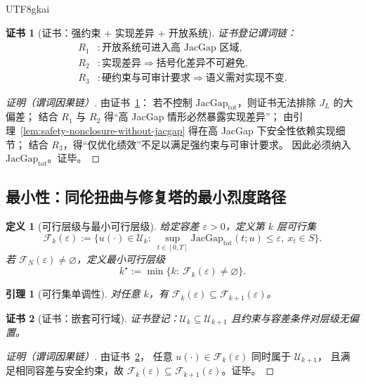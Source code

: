 \documentclass[12pt]{article}
\newtheorem{definition}{定义}[section]
\newtheorem{lemma}{引理}[section]
\newtheorem{Certificate}{证书}[section]
\newcommand{\JacGap}{\ensuremath{\mathrm{JacGap}}} %
\begin{document}
\begin{CJK*}{UTF8}{gkai}
\begin{Certificate}[证书：强约束 + 实现差异 + 开放系统]
\label{cert:necessity-jacgap}
证书登记谓词链：
\[
\begin{aligned}
  R_1 &: \text{开放系统可进入高 JacGap 区域},\\
  R_2 &: \text{实现差异}\Rightarrow\text{括号化差异不可避免},\\
  R_3 &: \text{硬约束与可审计要求} \Rightarrow \text{语义需对实现不变}.
\end{aligned}
\]
\end{Certificate}

\begin{proof}[证明（谓词因果链）]
由证书~\ref{cert:necessity-jacgap}：
若不控制 $\JacGap_{\mathrm{tot}}$，则证书无法排除 $J_L$ 的大偏差；
结合 $R_1$ 与 $R_2$ 得“高 JacGap 情形必然暴露实现差异”；
由引理~\ref{lem:safety-nonclosure-without-jacgap} 得在高 JacGap 下安全性依赖实现细节；
结合 $R_3$，得“仅优化绩效”不足以满足强约束与可审计要求。
因此必须纳入 $\JacGap_{\mathrm{tot}}$。证毕。
\end{proof}

\subsection{最小性：同伦扭曲与修复塔的最小烈度路径}
\label{sec:open-system-minimality}

\begin{definition}[可行层级与最小可行层级]
给定容差 $\varepsilon>0$，定义第 $k$ 层可行集
\[
  \mathcal{F}_k(\varepsilon)
  :=
  \bigl\{u(\cdot)\in\mathcal{U}_k:\ \sup_{t\in[0,T]}\JacGap_{\mathrm{tot}}(t;u)\le\varepsilon,\ x_t\in S\bigr\}.
\]
若 $\mathcal{F}_N(\varepsilon)\neq\varnothing$，定义最小可行层级
\[
  k^\star:=\min\{k:\ \mathcal{F}_k(\varepsilon)\neq\varnothing\}.
\]
\end{definition}

\begin{lemma}[可行集单调性]
\label{lem:feasible-set-monotone}
对任意 $k$，有 $\mathcal{F}_k(\varepsilon)\subseteq\mathcal{F}_{k+1}(\varepsilon)$。
\end{lemma}

\begin{Certificate}[证书：嵌套可行域]
\label{cert:feasible-set-monotone}
证书登记：$\mathcal{U}_k\subseteq\mathcal{U}_{k+1}$ 且约束与容差条件对层级无偏置。
\end{Certificate}

\begin{proof}[证明（谓词因果链）]
由证书~\ref{cert:feasible-set-monotone}，
任意 $u(\cdot)\in\mathcal{F}_k(\varepsilon)$ 同时属于 $\mathcal{U}_{k+1}$，
且满足相同容差与安全约束，故 $\mathcal{F}_k(\varepsilon)\subseteq\mathcal{F}_{k+1}(\varepsilon)$。证毕。
\end{proof}


\end{CJK*}
\end{document}
